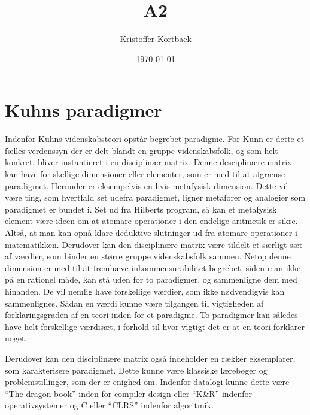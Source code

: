 \documentclass[11pt]{article}
\author{Kristoffer Kortbaek}
\date{\today}
\title{A2}
\begin{document}
\maketitle

\section{Kuhns paradigmer}
\label{sec:org14775c4}
Indenfor Kuhns videnskabsteori opstår begrebet paradigme. For Kunn er dette et fælles verdenssyn der
er delt blandt en gruppe videnskabsfolk, og som helt konkret, bliver instantieret i en disciplinær
matrix\cite{kap2}. Denne desciplinære matrix kan have for skellige dimensioner eller elementer, som
er med til at afgrænse paradigmet.
Herunder er eksempelvis en hvis metafysisk dimension\cite{kap2}. Dette vil være ting, som hvertfald
set udefra paradigmet, ligner metaforer og analogier som paradigmet er bundet i. Set ud fra Hilberts
program, så kan et metafysisk element være ideen om at atomare operationer i den endelige aritmetik
er sikre\cite{kap3}. Altså, at man kan opnå klare deduktive slutninger ud fra atomare operationer i
matematikken.
Derudover kan den disciplinære matrix være tildelt et særligt sæt af værdier, som binder en større
gruppe videnskabsfolk sammen\cite{kap2}. Netop denne dimension er med til at fremhæve
inkommensurabilitet begrebet, siden man ikke, på en rationel måde, kan stå uden for to paradigmer,
og sammenligne dem med hinanden\cite{kap3}. De vil nemlig have forskellige værdier, som ikke
nødvendigvis kan sammenlignes. Sådan en værdi kunne være tilgangen til vigtigheden af
forklaringsgraden af en teori inden for et paradigme. To paradigmer kan således have helt
forskellige værdisæt, i forhold til hvor vigtigt det er at en teori forklarer noget.

Derudover kan den disciplinære matrix også indeholder en rækker eksemplarer, som karakterisere
paradigmet\cite{kap2}. Dette kunne være klassiske lærebøger og problemstillinger, som der er enighed
om. Indenfor datalogi kunne dette være ``The dragon book'' inden for compiler design eller ``K\&R''
indenfor operativsystemer og C eller ``CLRS'' indenfor algoritmik.
\end{document}
